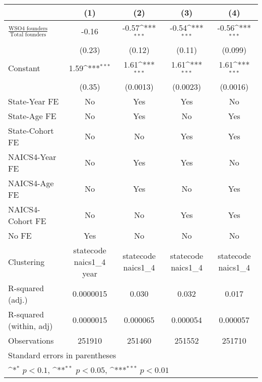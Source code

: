 {
\def\sym#1{\ifmmode^{#1}\else\(^{#1}\)\fi}
\begin{tabular}{l*{4}{c}}
\toprule
                    &\multicolumn{1}{c}{(1)}         &\multicolumn{1}{c}{(2)}         &\multicolumn{1}{c}{(3)}         &\multicolumn{1}{c}{(4)}         \\
\midrule
$\frac{\text{WSO4 founders}}{\text{Total founders}}$&       -0.16         &       -0.57\sym{***}&       -0.54\sym{***}&       -0.56\sym{***}\\
                    &      (0.23)         &      (0.12)         &      (0.11)         &     (0.099)         \\
\addlinespace
Constant            &        1.59\sym{***}&        1.61\sym{***}&        1.61\sym{***}&        1.61\sym{***}\\
                    &      (0.35)         &    (0.0013)         &    (0.0023)         &    (0.0016)         \\
\addlinespace
State-Year FE       &          No         &         Yes         &         Yes         &          No         \\
\addlinespace
State-Age FE        &          No         &         Yes         &          No         &         Yes         \\
\addlinespace
State-Cohort FE     &          No         &          No         &         Yes         &         Yes         \\
\addlinespace
NAICS4-Year FE      &          No         &         Yes         &         Yes         &          No         \\
\addlinespace
NAICS4-Age FE       &          No         &         Yes         &          No         &         Yes         \\
\addlinespace
NAICS4-Cohort FE    &          No         &          No         &         Yes         &         Yes         \\
\addlinespace
No FE               &         Yes         &          No         &          No         &          No         \\
\midrule
Clustering          &statecode naics1\_4 year         &statecode naics1\_4         &statecode naics1\_4         &statecode naics1\_4         \\
R-squared (adj.)    &   0.0000015         &       0.030         &       0.032         &       0.017         \\
R-squared (within, adj)&   0.0000015         &    0.000065         &    0.000054         &    0.000057         \\
Observations        &      251910         &      251460         &      251552         &      251710         \\
\bottomrule
\multicolumn{5}{l}{\footnotesize Standard errors in parentheses}\\
\multicolumn{5}{l}{\footnotesize \sym{*} \(p<0.1\), \sym{**} \(p<0.05\), \sym{***} \(p<0.01\)}\\
\end{tabular}
}
